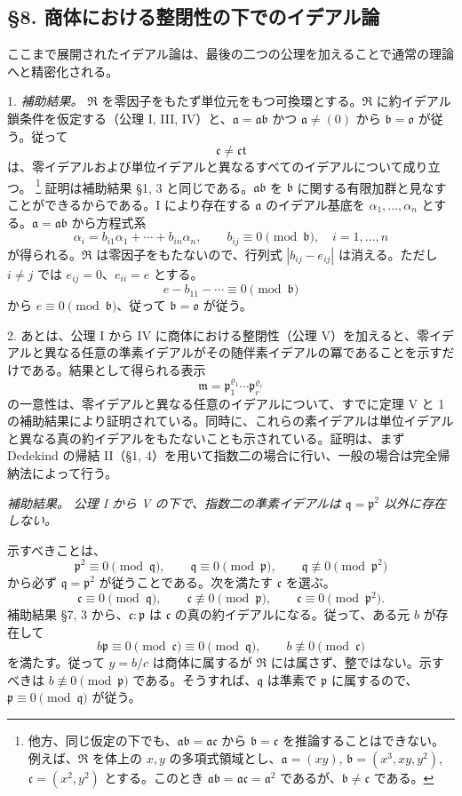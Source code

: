 \documentclass[11pt]{article}
\providecommand{\mR}{\mathfrak{R}}
\providecommand{\ma}{\mathfrak{a}}
\providecommand{\mb}{\mathfrak{b}}
\providecommand{\mc}{\mathfrak{c}}
\providecommand{\mm}{\mathfrak{m}}
\providecommand{\mo}{\mathfrak{o}}
\providecommand{\mpideal}{\mathfrak{p}}
\providecommand{\mq}{\mathfrak{q}}
\providecommand{\mt}{\mathfrak{t}}
\begin{document}
\subsection*{§8. 商体における整閉性の下でのイデアル論}

ここまで展開されたイデアル論は、最後の二つの公理を加えることで通常の理論へと精密化される。

1. \emph{補助結果。} $\mR$ を零因子をもたず単位元をもつ可換環とする。$\mR$ に約イデアル鎖条件を仮定する（公理 I, III, IV）と、$\ma=\ma\mb$ かつ $\ma\ne(0)$ から $\mb=\mo$ が従う。従って
\[
        \mc\ne\mc\mt
\]
は、零イデアルおよび単位イデアルと異なるすべてのイデアルについて成り立つ。
\footnote{他方、同じ仮定の下でも、$\ma\mb=\ma\mc$ から $\mb=\mc$ を推論することはできない。例えば、$\mR$ を体上の $x,y$ の多項式領域とし、$\ma=(xy)$, $\mb=(x^3,xy,y^2)$, $\mc=(x^2,y^2)$ とする。このとき $\ma\mb=\ma\mc=\ma^2$ であるが、$\mb\ne\mc$ である。}
証明は補助結果 §1, 3 と同じである。$\ma\mb$ を $\mb$ に関する有限加群と見なすことができるからである。I により存在する $\ma$ のイデアル基底を $\alpha_1,\ldots,\alpha_n$ とする。$\ma=\ma\mb$ から方程式系
\[
        \alpha_i=b_{i1}\alpha_1+\cdots+b_{in}\alpha_n,
        \qquad b_{ij}\equiv0\pmod{\mb},\quad i=1,\ldots,n
\]
が得られる。$\mR$ は零因子をもたないので、行列式 $|b_{ij}-e_{ij}|$ は消える。ただし $i\ne j$ では $e_{ij}=0$、$e_{ii}=e$ とする。
\[
        e-b_{11}-\cdots\equiv0\pmod{\mb}
\]
から $e\equiv0\pmod{\mb}$、従って $\mb=\mo$ が従う。

2. あとは、公理 I から IV に商体における整閉性（公理 V）を加えると、零イデアルと異なる任意の準素イデアルがその随伴素イデアルの冪であることを示すだけである。結果として得られる表示
\[
        \mm=\mpideal_1^{\varrho_1}\cdots\mpideal_r^{\varrho_r}
\]
の一意性は、零イデアルと異なる任意のイデアルについて、すでに定理 V と 1 の補助結果により証明されている。同時に、これらの素イデアルは単位イデアルと異なる真の約イデアルをもたないことも示されている。証明は、まず Dedekind の帰結 II（§1, 4）を用いて指数二の場合に行い、一般の場合は完全帰納法によって行う。

\emph{補助結果。} \emph{公理 I から V の下で、指数二の準素イデアルは $\mq=\mpideal^2$ 以外に存在しない。}

示すべきことは、
\[
        \mpideal^2\equiv0\pmod{\mq},
        \qquad \mq\equiv0\pmod{\mpideal},
        \qquad \mq\not\equiv0\pmod{\mpideal^2}
\]
から必ず $\mq=\mpideal^2$ が従うことである。次を満たす $\mc$ を選ぶ。
\[
        \mc\equiv0\pmod{\mq},
        \qquad \mc\not\equiv0\pmod{\mpideal},
        \qquad \mc\equiv0\pmod{\mpideal^2}.
\]
補助結果 §7, 3 から、$\mc:\mpideal$ は $\mc$ の真の約イデアルになる。従って、ある元 $b$ が存在して
\[
        b\mpideal\equiv0\pmod{\mc}\equiv0\pmod{\mq},
        \qquad b\not\equiv0\pmod{\mc}
\]
を満たす。従って $y=b/c$ は商体に属するが $\mR$ には属さず、整ではない。示すべきは $b\not\equiv0\pmod{\mpideal}$ である。そうすれば、$\mq$ は準素で $\mpideal$ に属するので、$\mpideal\equiv0\pmod{\mq}$ が従う。
\end{document}
